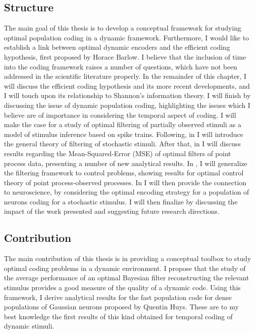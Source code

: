 \subsection*{Structure}
The main goal of this thesis is to develop a conceptual framework for studying optimal population coding in a dynamic framework. Furthermore, I would like to establish a link between optimal dynamic encoders and the efficient coding hypothesis, first proposed by Horace Barlow\cite{Barlow1961}. I believe that the inclusion of time into the coding framework raises a number of questions, which have not been addressed in the scientific literature properly. In the remainder of this chapter, I will discuss the efficient coding hypothesis and its more recent developments, and I will touch upon its relationship to Shannon's information theory\cite{Shannon1948}. I will finish by discussing the issue of dynamic population coding, highlighting the issues which I believe are of importance in considering the temporal aspect of coding. I will make the case for a study of optimal filtering of partially observed stimuli as a model of stimulus inference based on spike trains. Following, in   I will introduce the general theory of filtering of stochastic stimuli. After that, in  I will discuss results regarding the Mean-Squared-Error (MSE) of optimal filters of point process data, presenting a number of new analytical results. In , I will generalize the filtering framework to control problems, showing results for optimal control theory of point process-observed processes. In  I will then provide the connection to neuroscience, by considering the optimal encoding strategy for a population of neurons coding for a stochastic stimulus. I will then finalize by discussing the impact of the work presented and suggesting future research directions.\par

\subsection*{Contribution}
The main contribution of this thesis is in providing a conceptual toolbox to study optimal coding problems in a dynamic environment. I propose that the study of the average performance of an optimal Bayesian filter reconstructing the relevant stimulus provides a good measure of the quality of a dynamic code. Using this framework, I derive analytical results for the fast population code for dense populations of Gaussian neurons proposed by Quentin Huys\cite{Huys2007}. These are to my best knowledge the first results of this kind obtained for temporal coding of dynamic stimuli.

